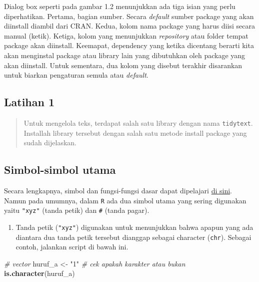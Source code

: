 \documentclass[]{book}
\newenvironment{Shaded}{\begin{snugshade}}{\end{snugshade}}
\newcommand{\CommentTok}[1]{\textcolor[rgb]{0.56,0.35,0.01}{\textit{#1}}}
\newcommand{\KeywordTok}[1]{\textcolor[rgb]{0.13,0.29,0.53}{\textbf{#1}}}
\newcommand{\NormalTok}[1]{#1}
\newcommand{\StringTok}[1]{\textcolor[rgb]{0.31,0.60,0.02}{#1}}
\providecommand{\tightlist}{%
  \setlength{\itemsep}{0pt}\setlength{\parskip}{0pt}}
\begin{document}
Dialog box seperti pada gambar 1.2 menunjukkan ada tiga isian yang perlu
diperhatikan. Pertama, bagian sumber. Secara \emph{default} sumber
package yang akan diinstall diambil dari CRAN. Kedua, kolom nama package
yang harus diisi secara manual (ketik). Ketiga, kolom yang menunjukkan
\emph{repository} atau folder tempat package akan diinstall. Keemapat,
dependency yang ketika dicentang berarti kita akan menginstal package
atau library lain yang dibutuhkan oleh package yang akan diinstall.
Untuk sementara, dua kolom yang disebut terakhir disarankan untuk
biarkan pengaturan semula atau \emph{default}.

\hypertarget{latihan-1}{%
\subsection{Latihan 1}\label{latihan-1}}

\begin{quote}
Untuk mengelola teks, terdapat salah satu library dengan nama
\texttt{tidytext}. Installah library tersebut dengan salah satu metode
install package yang sudah dijelaskan.
\end{quote}

\hypertarget{simbol-simbol-utama}{%
\subsection{Simbol-simbol utama}\label{simbol-simbol-utama}}

Secara lengkapnya, simbol dan fungsi-fungsi dasar dapat dipelajari
\href{https://www.rstudio.com/wp-content/uploads/2016/05/base-r.pdf}{di
sini}. Namun pada umumnya, dalam \texttt{R} ada dua simbol utama yang
sering digunakan yaitu \texttt{"xyz"} (tanda petik) dan \texttt{\#}
(tanda pagar).

\begin{enumerate}
\def\labelenumi{\arabic{enumi}.}
\tightlist
\item
  Tanda petik (\texttt{"xyz"}) digunakan untuk menunjukkan bahwa apapun
  yang ada diantara dua tanda petik tersebut dianggap sebagai character
  (\texttt{chr}). Sebagai contoh, jalankan script di bawah ini.
\end{enumerate}

\begin{Shaded}
\begin{Highlighting}[]
\CommentTok{# vector}
\NormalTok{huruf_a <-}\StringTok{ "1"}
\CommentTok{# cek apakah karakter atau bukan}
\KeywordTok{is.character}\NormalTok{(huruf_a)}
\end{Highlighting}
\end{Shaded}
\end{document}
